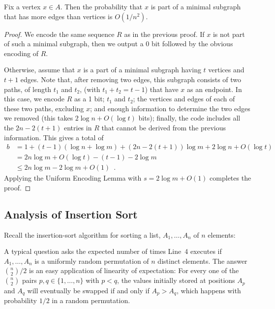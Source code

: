 \documentclass{patmorin}
\begin{document}
\begin{thm}
  Fix a vertex $x\in A$.  Then the probability that $x$ is part of a
  minimal subgraph that has more edges than vertices is $O(1/n^2)$.
\end{thm}

\begin{proof}
  We encode the same sequence $R$ as in the previous proof.
  If $x$ is not part of such a minimal subgraph, then we output a 0 bit
  followed by the obvious encoding of $R$.

  Otherwise, assume that $x$ is a part of a minimal subgraph having
  $t$ vertices and $t+1$ edges. Note that, after removing two edges,
  this subgraph consists of two paths, of length $t_1$ and $t_2$,
  (with $t_1+t_2=t-1$) that have $x$ as an endpoint.  In this case,
  we encode $R$ as a 1 bit; $t_1$ and $t_2$; the vertices and edges
  of each of these two paths, excluding $x$; and enough information to
  determine the two edges we removed (this takes $2\log n + O(\log t)$
  bits); finally, the code includes all the $2n-2(t+1)$ entries in $R$
  that cannot be derived from the previous information. This gives a total of
  \begin{align*}
     b &= 1 + (t-1)(\log n+\log m) + (2n-2(t+1))\log m + 2\log n + O(\log t) \\
        &= 2n\log m + O(\log t) - (t-1) - 2\log m \\
       & \le 2n\log m - 2\log m + O(1) \enspace .
  \end{align*}
  Applying the Uniform Encoding Lemma with $s=2\log m+O(1)$ completes
  the proof.
\end{proof}


\subsection{Analysis of Insertion Sort}

Recall the insertion-sort algorithm for sorting a list, $A_1,\ldots,A_n$
of $n$ elements:

\begin{algorithmic}[1]
     \ENDWHILE
  \ENDFOR
\end{algorithmic}

A typical question asks the expected number of times Line~4 executes
if $A_1,\ldots,A_n$ is a uniformly random permutation of $n$ distinct
elements.  The answer $\binom{n}{2}/2$ is an easy application of
linearity of expectation: For every one of the $\binom{n}{2}$ pairs
$p,q\in\{1,\ldots,n\}$ with $p<q$, the values initially stored at
positions $A_p$ and $A_q$ will eventually be swapped if and only if $A_p >
A_q$, which happens with probability $1/2$ in a random permutation.
\end{document}
